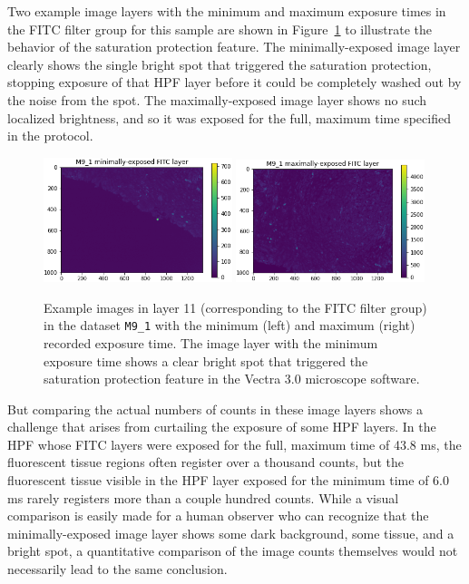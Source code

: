 \documentclass[letterpaper,11pt]{article}
\newcommand{\reffig}[1]{Figure~\ref{#1}}
\begin{document}
Two example image layers with the minimum and maximum exposure times in the FITC filter group for this sample are shown in \reffig{fig:max_min_M9_1_fitc_images} to illustrate the behavior of the saturation protection feature. The minimally-exposed image layer clearly shows the single bright spot that triggered the saturation protection, stopping exposure of that HPF layer before it could be completely washed out by the noise from the spot. The maximally-exposed image layer shows no such localized brightness, and so it was exposed for the full, maximum time specified in the protocol.

\begin{figure}[!ht]
\centering
\includegraphics[width=0.49\textwidth]{images/introduction/min_exposure_M9_1_fitc_image}
\includegraphics[width=0.49\textwidth]{images/introduction/max_exposure_M9_1_fitc_image}
\caption{\footnotesize Example images in layer 11 (corresponding to the FITC filter group) in the dataset \texttt{M9\_1} with the minimum (left) and maximum (right) recorded exposure time. The image layer with the minimum exposure time shows a clear bright spot that triggered the saturation protection feature in the Vectra 3.0 microscope software.}
\label{fig:max_min_M9_1_fitc_images}
\end{figure}

But comparing the actual numbers of counts in these image layers shows a challenge that arises from curtailing the exposure of some HPF layers. In the HPF whose FITC layers were exposed for the full, maximum time of 43.8 ms, the fluorescent tissue regions often register over a thousand counts, but the fluorescent tissue visible in the HPF layer exposed for the minimum time of 6.0 ms rarely registers more than a couple hundred counts. While a visual comparison is easily made for a human observer who can recognize that the minimally-exposed image layer shows some dark background, some tissue, and a bright spot, a quantitative comparison of the image counts themselves would not necessarily lead to the same conclusion.
\end{document}
